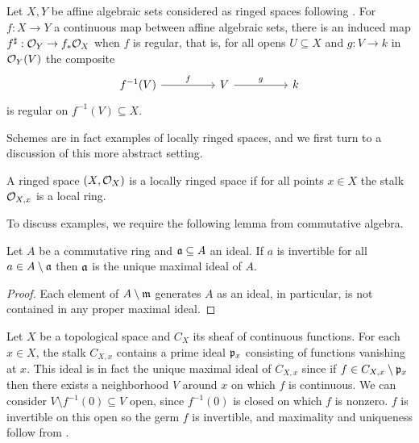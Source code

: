 \begin{example}
    Let $X,Y$ be affine algebraic sets considered as ringed spaces following . For $f:X\to Y$ a continuous map between affine algebraic sets, there is an induced map $f^{\sharp}:\mathcal{O}_{Y}\to f_{*}\mathcal{O}_{X}$ when $f$ is regular, that is, for all opens $U\subseteq X$ and $g:V\to k$ in $\mathcal{O}_{Y}(V)$ the composite 
    $$%
    \begin{tikzcd}
        {f^{-1}(V)} && V && k
        \arrow["f", from=1-1, to=1-3]
        \arrow["g", from=1-3, to=1-5]
    \end{tikzcd}$$
    is regular on $f^{-1}(V)\subseteq X$. 
\end{example}
Schemes are in fact examples of locally ringed spaces, and we first turn to a discussion of this more abstract setting. 
\begin{definition}\label{def: locally ringed space}
    A ringed space $(X,\mathcal{O}_{X})$ is a locally ringed space if for all points $x\in X$ the stalk $\mathcal{O}_{X,x}$ is a local ring. 
\end{definition}
To discuss examples, we require the following lemma from commutative algebra. 
\begin{lemma}\label{lem: complement of ideal invertible implies ideal is unique maximal}
    Let $A$ be a commutative ring and $\mathfrak{a}\subseteq A$ an ideal. If $a$ is invertible for all $a\in A\setminus\mathfrak{a}$ then $\mathfrak{a}$ is the unique maximal ideal of $A$. 
\end{lemma}
\begin{proof}
    Each element of $A\setminus\mathfrak{m}$ generates $A$ as an ideal, in particular, is not contained in any proper maximal ideal. 
\end{proof}
\begin{example}
    Let $X$ be a topological space and $C_{X}$ its sheaf of continuous functions. For each $x\in X$, the stalk $C_{X,x}$ contains a prime ideal $\mathfrak{p}_{x}$ consisting of functions vanishing at $x$. This ideal is in fact the unique maximal ideal of $C_{X,x}$ since if $f\in C_{X,x}\setminus\mathfrak{p}_{x}$ then there exists a neighborhood $V$ around $x$ on which $f$ is continuous. We can consider $V\setminus f^{-1}(0)\subseteq V$ open, since $f^{-1}(0)$ is closed on which $f$ is nonzero. $f$ is invertible on this open so the germ $f$ is invertible, and maximality and uniqueness follow from . 
\end{example}
